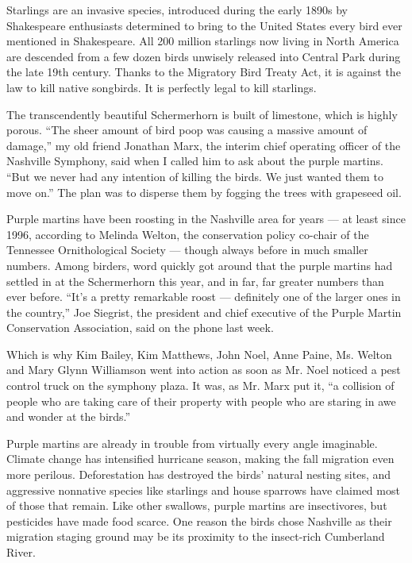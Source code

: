 Starlings are an invasive species, introduced during the early 1890s by
Shakespeare enthusiasts determined to bring to the United States every
bird ever mentioned in Shakespeare. All 200 million starlings now living
in North America are descended from a few dozen birds unwisely released
into Central Park during the late 19th century. Thanks to the Migratory
Bird Treaty Act, it is against the law to kill native songbirds. It is
perfectly legal to kill starlings.

The transcendently beautiful Schermerhorn is built of limestone, which
is highly porous. ``The sheer amount of bird poop was causing a massive
amount of damage,'' my old friend Jonathan Marx, the interim chief
operating officer of the Nashville Symphony, said when I called him to
ask about the purple martins. ``But we never had any intention of
killing the birds. We just wanted them to move on.'' The plan was to
disperse them by fogging the trees with grapeseed oil.

Purple martins have been roosting in the Nashville area for years --- at
least since 1996, according to Melinda Welton, the conservation policy
co-chair of the Tennessee Ornithological Society --- though always
before in much smaller numbers. Among birders, word quickly got around
that the purple martins had settled in at the Schermerhorn this year,
and in far, far greater numbers than ever before. ``It's a pretty
remarkable roost --- definitely one of the larger ones in the country,''
Joe Siegrist, the president and chief executive of the Purple Martin
Conservation Association, said on the phone last week.

Which is why Kim Bailey, Kim Matthews, John Noel, Anne Paine, Ms. Welton
and Mary Glynn Williamson went into action as soon as Mr. Noel noticed a
pest control truck on the symphony plaza. It was, as Mr. Marx put it,
``a collision of people who are taking care of their property with
people who are staring in awe and wonder at the birds.''

Purple martins are already in trouble from virtually every angle
imaginable. Climate change has intensified hurricane season, making the
fall migration even more perilous. Deforestation has destroyed the
birds' natural nesting sites, and aggressive nonnative species like
starlings and house sparrows have claimed most of those that remain.
Like other swallows, purple martins are insectivores, but pesticides
have made food scarce. One reason the birds chose Nashville as their
migration staging ground may be its proximity to the insect-rich
Cumberland River.

